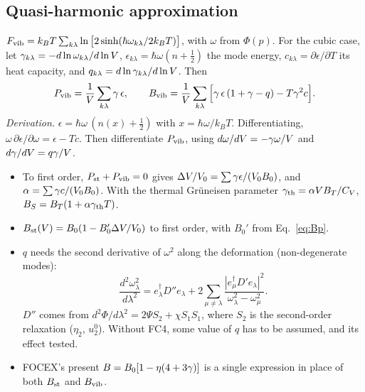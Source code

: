 \documentclass[11pt,a4paper]{article}
\newcommand{\la}{\lambda}\newcommand{\ep}{\varepsilon}\newcommand{\si}{\sigma}\newcommand{\Ga}{\Gamma}
\begin{document}
\subsection{Quasi-harmonic approximation}
$F_{\rm vib}=k_BT\sum_{k\la}\ln\big[2\sinh(\hbar\omega_{k\la}/2k_BT)\big]$, with $\omega$ from $\Phi(p)$. For the cubic
case, let $\ga_{k\la}=-d\ln\omega_{k\la}/d\ln V$, $\epsilon_{k\la}=\hbar\omega(n+\tfrac12)$ the mode energy,
$c_{k\la}=\partial\epsilon/\partial T$ its heat capacity, and $q_{k\la}=d\ln\ga_{k\la}/d\ln V$. Then
\begin{equation}
P_{\rm vib}=\frac1V\sum_{k\la}\ga\,\epsilon ,\qquad
B_{\rm vib}=\frac1V\sum_{k\la}\Big[\ga\,\epsilon\,(1+\ga-q)-T\ga^2c\Big].
\label{eq:Bvib}
\end{equation}
\emph{Derivation.} $\epsilon=\hbar\omega\,(n(x)+\tfrac12)$ with $x=\hbar\omega/k_BT$. Differentiating, $\omega\,\partial\epsilon/\partial\omega=\epsilon-Tc$.
Then differentiate $P_{\rm vib}$, using $d\omega/dV=-\gamma\omega/V$ and $d\gamma/dV=q\gamma/V$.
\begin{itemize}
\item To first order, $P_{\rm st}+P_{\rm vib}=0$ gives $\Delta V/V_0=\sum\gamma\epsilon/(V_0B_0)$, and
  $\alpha=\sum\gamma c/(V_0B_0)$. With the thermal Gr\"uneisen parameter $\gamma_{\rm th}=\alpha VB_T/C_V$,
  $B_S=B_T(1+\alpha\gamma_{\rm th}T)$.
\item $B_{\rm st}(V)=B_0(1-B_0'\Delta V/V_0)$ to first order, with $B_0'$ from Eq.~\eqref{eq:Bp}.
\item $q$ needs the second derivative of $\omega^2$ along the deformation (non-degenerate modes):
  \[
  \frac{d^2\omega^2_\la}{d\la^2}=e_\la^\dagger D''e_\la+2\sum_{\mu\neq\la}\frac{|e_\mu^\dagger D'e_\la|^2}{\omega_\la^2-\omega_\mu^2}.
  \]
  $D''$ comes from $d^2\Phi/d\la^2=2\Psi S_2+\chi S_1S_1$, where $S_2$ is the second-order relaxation
  ($\eta_2$, $u^0_2$). Without FC4, some value of $q$ has to be assumed, and its effect tested.
\item FOCEX's present $B=B_0[1-\eta(4+3\gamma)]$ is a single expression in place of both $B_{\rm st}$ and $B_{\rm vib}$.
\end{itemize}
\end{document}
